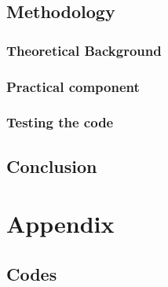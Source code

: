 \documentclass[11pt,a4paper]{report}
\begin{document}
\section{Methodology} \label{methodology}
\subsection{Theoretical Background} \label{theory}
\subsection{Practical component} \label{practice}
\subsection{Testing the code}

\section{Conclusion} \label{conclusion}

\chapter{Appendix} \label{chap:code}
\section{Codes}


{}

\end{document}
